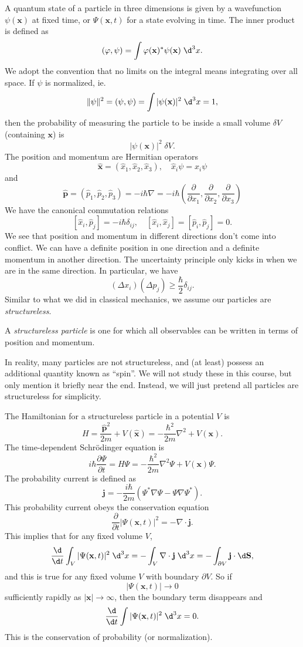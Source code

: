 \documentclass[a4paper]{article}
\begin{document}
A quantum state of a particle in three dimensions is given by a wavefunction $\psi(\mathbf{x})$ at fixed time, or $\Psi(\mathbf{x}, t)$ for a state evolving in time. The inner product is defined as
\[
  (\varphi, \psi) = \int \varphi(\mathbf{x})^* \psi(\mathbf{x})\;\d^3 x.
\]
We adopt the convention that no limits on the integral means integrating over all space. If $\psi$ is normalized, ie.
\[
  \|\psi\|^2 = (\psi, \psi) = \int |\psi(\mathbf{x})|^2 \;\d^3 x = 1,
\]
then the probability of measuring the particle to be inside a small volume $\delta V$ (containing $\mathbf{x}$) is
\[
  |\psi(\mathbf{x})|^2\; \delta V.
\]
The position and momentum are Hermitian operators
\[
  \hat{\mathbf{x}} = (\hat{x}_1, \hat{x}_2, \hat{x}_3),\quad \hat{x}_i \psi = x_i \psi
\]
and
\[
  \hat{\mathbf{p}} = (\hat{p}_1, \hat{p}_2, \hat{p}_3) = -i\hbar \nabla = -i\hbar \left(\frac{\partial}{\partial x_1}, \frac{\partial}{\partial x_2}, \frac{\partial}{\partial x_3}\right)
\]
We have the canonical commutation relations
\[
  [\hat{x}_i, \hat{p}_j] = -i\hbar \delta_{ij},\quad [\hat{x}_i, \hat{x}_j] = [\hat{p}_i, \hat{p}_j] = 0.
\]
We see that position and momentum in different directions don't come into conflict. We can have a definite position in one direction and a definite momentum in another direction. The uncertainty principle only kicks in when we are in the same direction. In particular, we have
\[
  (\Delta x_i)(\Delta p_j) \geq \frac{\hbar}{2} \delta_{ij}.
\]
Similar to what we did in classical mechanics, we assume our particles are \emph{structureless}.
\begin{defi}
  A \emph{structureless particle} is one for which all observables can be written in terms of position and momentum.
\end{defi}
In reality, many particles are not structureless, and (at least) possess an additional quantity known as ``spin''. We will not study these in this course, but only mention it briefly near the end. Instead, we will just pretend all particles are structureless for simplicity.

The Hamiltonian for a structureless particle in a potential $V$ is
\[
  H = \frac{\hat{\mathbf{p}}^2}{2m} + V(\hat{\mathbf{x}}) = -\frac{\hbar^2}{2m} \nabla^2 + V(\mathbf{x}).
\]
The time-dependent Schr\"odinger equation is
\[
  i \hbar \frac{\partial \Psi}{\partial t} = H \Psi = -\frac{\hbar^2}{2m} \nabla^2\Psi + V(\mathbf{x})\Psi.
\]
The probability current is defined as
\[
  \mathbf{j} = -\frac{i\hbar}{2m} (\Psi^* \nabla \Psi - \Psi \nabla \Psi^*).
\]
This probability current obeys the conservation equation
\[
  \frac{\partial}{\partial t}|\Psi(\mathbf{x}, t)|^2 = -\nabla \cdot \mathbf{j}.
\]
This implies that for any fixed volume $V$,
\[
  \frac{\d}{\d t}\int_V |\Psi(\mathbf{x}, t)|^2 \;\d^3 x = -\int_V \nabla \cdot \mathbf{j}\;\d^3 x = -\int_{\partial V} \mathbf{j}\cdot \d \mathbf{S},
\]
and this is true for any fixed volume $V$ with boundary $\partial V$. So if
\[
  |\Psi(\mathbf{x}, t)| \to 0
\]
sufficiently rapidly as $|\mathbf{x}| \to \infty$, then the boundary term disappears and
\[
  \frac{\d}{\d t}\int |\Psi(\mathbf{x}, t)|^2 \;\d^3 x = 0.
\]
This is the conservation of probability (or normalization).
\end{document}
